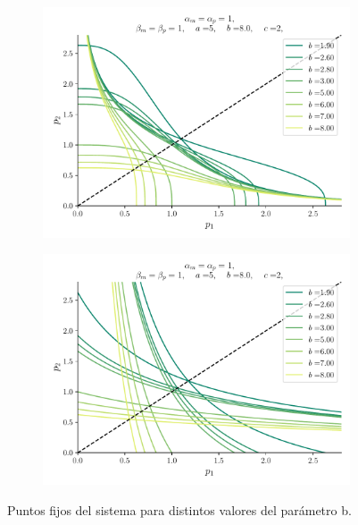 \documentclass[twocolumn,aps,prl]{revtex4-1}
\begin{document}
\begin{figure}[ht!]
  \centering
  \begin{subfigure}[b]{0.49\linewidth}
      \centering
      \includegraphics[width = 0.999\textwidth]{figuras/ex02-cosa1-2.pdf}
      \caption{}
      \label{fig:figuras/ex02-cosa1-2}
  \end{subfigure}\quad
  \begin{subfigure}[b]{0.49\linewidth}
      \centering
      \includegraphics[width = 0.999\textwidth]{figuras/ex02-cosa1-3.pdf}
      \caption{}
      \label{fig:figuras/ex02-cosa1-3}
  \end{subfigure}\quad
  \caption{Puntos fijos del sistema para distintos valores del parámetro b.}
  \label{fig:figuras/ex02-puntos fijos}
\end{figure}
\end{document}
